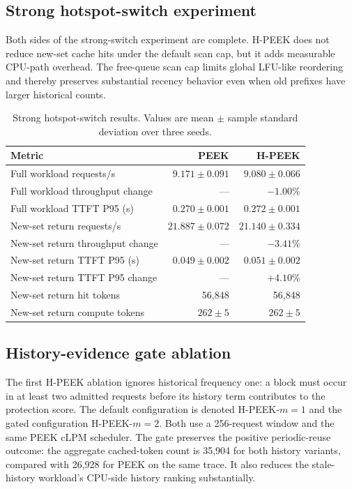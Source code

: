 \documentclass[10pt,twocolumn]{article}
\begin{document}
\subsection{Strong hotspot-switch experiment}

Both sides of the strong-switch experiment are complete. H-PEEK does not reduce
new-set cache hits under the default scan cap, but it adds measurable CPU-path
overhead. The free-queue scan cap limits global LFU-like reordering and thereby
preserves substantial recency behavior even when old prefixes have larger
historical counts.

\begin{table}[t]
  \centering
  \caption{Strong hotspot-switch results. Values are mean $\pm$ sample
  standard deviation over three seeds.}
  \label{tab:strong-switch-progress}
  \begin{tabular}{lrr}
    \toprule
    Metric & PEEK & H-PEEK \\
    \midrule
    Full workload requests/s & $9.171\pm0.091$ & $9.080\pm0.066$ \\
    Full workload throughput change & --- & $-1.00\%$ \\
    Full workload TTFT P95 (s) & $0.270\pm0.001$ & $0.272\pm0.001$ \\
    New-set return requests/s & $21.887\pm0.072$ & $21.140\pm0.334$ \\
    New-set return throughput change & --- & $-3.41\%$ \\
    New-set return TTFT P95 (s) & $0.049\pm0.002$ & $0.051\pm0.002$ \\
    New-set return TTFT P95 change & --- & $+4.10\%$ \\
    New-set return hit tokens & 56,848 & 56,848 \\
    New-set return compute tokens & $262\pm5$ & $262\pm5$ \\
    \bottomrule
  \end{tabular}
\end{table}

\subsection{History-evidence gate ablation}

The first H-PEEK ablation ignores historical frequency one: a block must occur
in at least two admitted requests before its history term contributes to the
protection score. The default configuration is denoted H-PEEK-$m{=}1$ and the
gated configuration H-PEEK-$m{=}2$. Both use a 256-request window and the same
PEEK cLPM scheduler. The gate preserves the positive periodic-reuse outcome:
the aggregate cached-token count is 35,904 for both history variants, compared
with 26,928 for PEEK on the same trace. It also reduces the stale-history
workload's CPU-side history ranking substantially.
\end{document}
